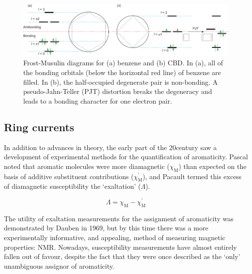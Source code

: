 		\begin{figure}[ht!]
			\centering\includegraphics{figures/intro/huckel.pdf} 
			\caption[]{Frost-Musulin diagrams for (a) benzene and (b) CBD\@. In (a), all of the bonding orbitals (below the horizontal red line) of benzene are filled. In (b), the half-occupied degenerate pair is non-bonding. A pseudo-Jahn-Teller (PJT) distortion breaks the degeneracy and leads to a bonding character for one electron pair.}
			\label{fig:intro:huckel}
		\end{figure}

		\FloatBarrier

	\subsection{Ring currents}

		In addition to advances in theory, the early part of the 20\nth century saw a development of experimental methods for the quantification of aromaticity. Pascal noted that aromatic molecules were more diamagnetic ($\chi_\text{M}$) than expected on the basis of additive substituent contributions ($\chi_{\text{M}}^\prime{}$),\autocite{pascal1910magnetochemical} and Pacault termed this excess of diamagnetic susceptibility the `exaltation' ($\Lambda$).\autocite{Pacault1961,Gleiter2012} 

		\begin{equation}
			\Lambda = \chi_\text{M} - \chi_{\text{M}}^\prime{}
		\end{equation}

		The utility of exaltation measurements for the assignment of aromaticity was demonstrated by Dauben  in 1969,\autocite{Dauben1969} but by this time there was a more experimentally informative, and appealing, method of measuring magnetic properties: NMR\@. Nowadays, susceptibility measurements have almost entirely fallen out of favour,\autocite{Gershoni-Poranne2015} despite the fact that they were once described as the `only' unambiguous assignor of aromaticity.\autocite{Schleyer1996a}

